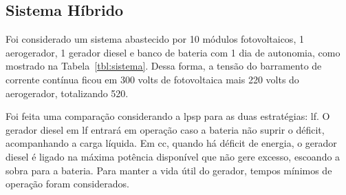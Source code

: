 

\subsection{Sistema Híbrido}

Foi considerado um sistema abastecido por 10 módulos fotovoltaicos, 1
aerogerador, 1 gerador diesel e banco de bateria com 1 dia de autonomia, como
mostrado na Tabela~\ref{tbl:sistema}.
Dessa forma, a tensão do barramento de corrente contínua ficou em 300 volts de
fotovoltaica mais 220 volts do aerogerador, totalizando 520.



Foi feita uma comparação considerando a \acrshort{lpsp} para as duas
estratégias: \acrshort{lf}.  O gerador diesel em
\acrshort{lf} entrará em operação caso a bateria não suprir o déficit,
acompanhando a carga líquida.  Em \acrshort{cc}, quando há déficit de energia, o
gerador diesel é ligado na máxima potência disponível que não gere excesso,
escoando a sobra para a bateria. Para manter a vida útil do gerador, tempos
mínimos de operação foram considerados.
